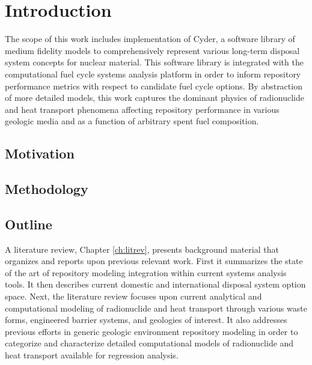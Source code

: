 \chapter{Introduction}\label{ch:introduction}


The scope of this work includes implementation of Cyder, a software library of medium 
fidelity models to comprehensively represent various long-term disposal system 
concepts for nuclear material. This software library is integrated with the 
\Cyclus computational fuel cycle systems analysis platform in order to inform repository 
performance metrics with respect to candidate fuel cycle options. By abstraction 
of more detailed models, this work captures the dominant physics of 
radionuclide and heat transport phenomena affecting repository performance in 
various geologic media and as a function of arbitrary spent fuel composition. 

\section{Motivation} 


\section{Methodology} 

\section{Outline}

A literature review, Chapter \ref{ch:litrev}, presents background material that organizes and 
reports upon previous relevant work. First it summarizes the state of the art of 
repository modeling integration within current systems analysis tools. It then 
describes current domestic and international disposal system option space. 
Next, the literature review focuses upon current analytical and 
computational modeling of radionuclide and heat transport through various waste 
forms, engineered barrier systems, and geologies of interest.  It also 
addresses previous efforts in generic geologic environment repository modeling in order to 
categorize and characterize detailed computational models of radionuclide and 
heat transport available for regression analysis.


